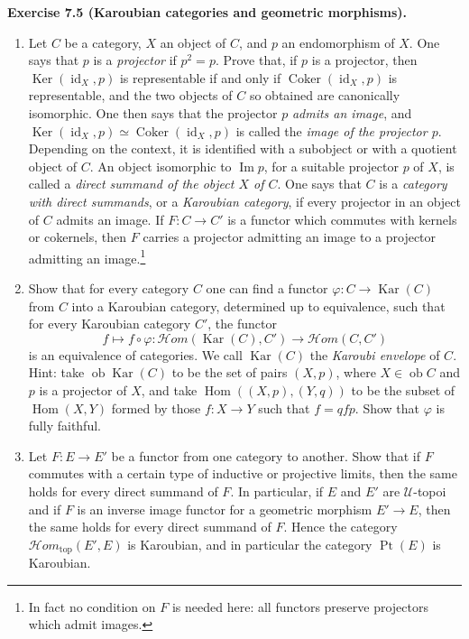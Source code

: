 \documentclass[11pt]{article}
\newcommand{\U}{\mathcal{U}}
\newcommand{\Hom}{\operatorname{Hom}}
\newcommand{\id}{\operatorname{id}}
\newcommand{\Ppoint}{\operatorname{Pt}}
\newcommand{\Hhom}{\mathcal{H}om}
\newcommand{\Hhomtop}{\mathcal{H}om_{\mathrm{top}}}
\newenvironment{remarktext}[1]{\par\medskip\noindent\textbf{#1.}\ }{\par\medskip}
\providecommand{\ob}{\operatorname{ob}}
\providecommand{\Ker}{\operatorname{Ker}}
\providecommand{\Coker}{\operatorname{Coker}}
\providecommand{\im}{\operatorname{Im}}
\providecommand{\kar}{\operatorname{Kar}}
\begin{document}
\begin{remarktext}{Exercise 7.5 (Karoubian categories and geometric morphisms)}
\begin{enumerate}[label=\alph*)]
\item Let \(C\) be a category, \(X\) an object of \(C\), and \(p\) an endomorphism of \(X\). One says that \(p\) is a \emph{projector} if \(p^2=p\). Prove that, if \(p\) is a projector, then \(\Ker(\id_X,p)\) is representable if and only if \(\Coker(\id_X,p)\) is representable, and the two objects of \(C\) so obtained are canonically isomorphic. One then says that the projector \(p\) \emph{admits an image}, and \(\Ker(\id_X,p)\simeq\Coker(\id_X,p)\) is called the \emph{image of the projector \(p\)}. Depending on the context, it is identified with a subobject or with a quotient object of \(C\). An object isomorphic to \(\im p\), for a suitable projector \(p\) of \(X\), is called a \emph{direct summand of the object \(X\) of \(C\)}. One says that \(C\) is a \emph{category with direct summands}, or a \emph{Karoubian category}, if every projector in an object of \(C\) admits an image. If \(F:C\to C'\) is a functor which commutes with kernels or cokernels, then \(F\) carries a projector admitting an image to a projector admitting an image.\footnote{In fact no condition on \(F\) is needed here: all functors preserve projectors which admit images.}

\item Show that for every category \(C\) one can find a functor \(\varphi:C\to\kar(C)\) from \(C\) into a Karoubian category, determined up to equivalence, such that for every Karoubian category \(C'\), the functor
\[
f\longmapsto f\circ\varphi:\Hhom(\kar(C),C')\longrightarrow\Hhom(C,C')
\]
is an equivalence of categories. We call \(\kar(C)\) the \emph{Karoubi envelope} of \(C\). Hint: take \(\ob\kar(C)\) to be the set of pairs \((X,p)\), where \(X\in\ob C\) and \(p\) is a projector of \(X\), and take \(\Hom((X,p),(Y,q))\) to be the subset of \(\Hom(X,Y)\) formed by those \(f:X\to Y\) such that \(f=qfp\). Show that \(\varphi\) is fully faithful.

\item Let \(F:E\to E'\) be a functor from one category to another. Show that if \(F\) commutes with a certain type of inductive or projective limits, then the same holds for every direct summand of \(F\). In particular, if \(E\) and \(E'\) are \(\U\)-topoi and if \(F\) is an inverse image functor for a geometric morphism \(E'\to E\), then the same holds for every direct summand of \(F\). Hence the category \(\Hhomtop(E',E)\) is Karoubian, and in particular the category \(\Ppoint(E)\) is Karoubian.


\end{enumerate}
\end{remarktext}
\end{document}
